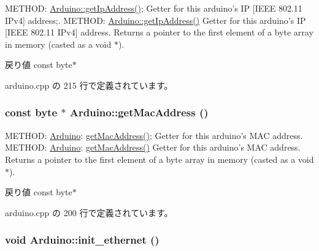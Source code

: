METHOD: \hyperlink{classArduino_ae412da451a2a3df9b8c123b98b188b7b_ae412da451a2a3df9b8c123b98b188b7b}{Arduino::getIpAddress()}; Getter for this arduino's IP \mbox{[}IEEE 802.11 IPv4\mbox{]} address;. METHOD: \hyperlink{classArduino_ae412da451a2a3df9b8c123b98b188b7b_ae412da451a2a3df9b8c123b98b188b7b}{Arduino::getIpAddress()} Getter for this arduino's IP \mbox{[}IEEE 802.11 IPv4\mbox{]} address. Returns a pointer to the first element of a byte array in memory (casted as a void $\ast$).

\begin{DoxyReturn}{戻り値}
const byte$\ast$ 
\end{DoxyReturn}


 arduino.cpp の 215 行で定義されています。\hypertarget{classArduino_a41e64fc2b71a7a7d4483174bfb6ce652_a41e64fc2b71a7a7d4483174bfb6ce652}{
\subsubsection[{getMacAddress}]{\setlength{\rightskip}{0pt plus 5cm}const byte $\ast$ Arduino::getMacAddress ()}}
\label{classArduino_a41e64fc2b71a7a7d4483174bfb6ce652_a41e64fc2b71a7a7d4483174bfb6ce652}


METHOD: \hyperlink{classArduino}{Arduino}: \hyperlink{classArduino_a41e64fc2b71a7a7d4483174bfb6ce652_a41e64fc2b71a7a7d4483174bfb6ce652}{getMacAddress()}; Getter for this arduino's MAC address. METHOD: \hyperlink{classArduino}{Arduino}: \hyperlink{classArduino_a41e64fc2b71a7a7d4483174bfb6ce652_a41e64fc2b71a7a7d4483174bfb6ce652}{getMacAddress()} Getter for this arduino's MAC address. Returns a pointer to the first element of a byte array in memory (casted as a void $\ast$).

\begin{DoxyReturn}{戻り値}
const byte$\ast$ 
\end{DoxyReturn}


 arduino.cpp の 200 行で定義されています。\hypertarget{classArduino_a1839d0c9bcb7c8b7f3fef2d8ac9eaad0_a1839d0c9bcb7c8b7f3fef2d8ac9eaad0}{
\subsubsection[{init\_\-ethernet}]{\setlength{\rightskip}{0pt plus 5cm}void Arduino::init\_\-ethernet ()}}
\label{classArduino_a1839d0c9bcb7c8b7f3fef2d8ac9eaad0_a1839d0c9bcb7c8b7f3fef2d8ac9eaad0}


